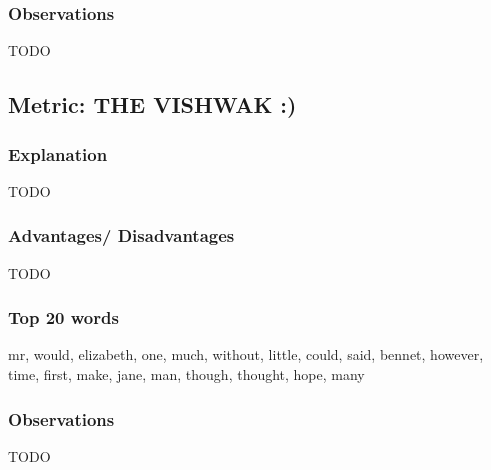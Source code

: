 \documentclass{article}
\begin{document}
\subsubsection{Observations}
TODO

\newpage
\subsection{Metric: THE VISHWAK :) }
\subsubsection{Explanation}
TODO
\subsubsection{Advantages/ Disadvantages}
TODO
\subsubsection{Top 20 words}
\begin{flushleft}
	mr, would, elizabeth, one, much, without, little, could, said, bennet, however, time, first, make, jane, man, though, thought, hope, many
\end{flushleft}
\subsubsection{Observations}
TODO
\end{document}
